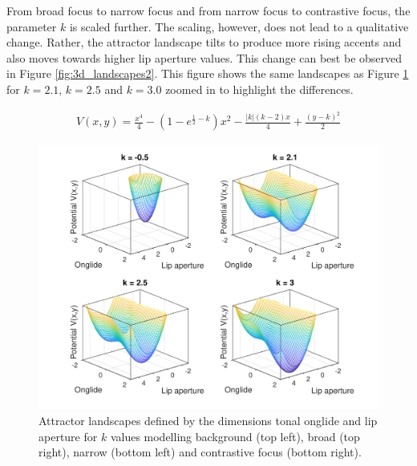From broad focus to narrow focus and from narrow focus to contrastive focus, the parameter $k$ is scaled further. The scaling, however, does not lead to a qualitative change. Rather, the attractor landscape tilts to produce more rising accents and also moves towards higher lip aperture values. This change can best be observed in Figure \ref{fig:3d_landscapes2}. This figure shows the same landscapes as Figure \ref{fig:3d_landscapes1} for $k = 2.1$, $k = 2.5$ and $k = 3.0$ zoomed in to highlight the differences.

\begin{equation}
\begin{split}
V(x,y) = \frac{x^4}{4} - (1-e^{\frac{1}{2}-k})x^2 - \frac{|k|(k-2)x}{4} + \frac{(y-k)^2}{2}
\label{eq:onglide_lips_model}
\end{split}
\end{equation}

\begin{figure}
\includegraphics[width=\textwidth]{figures/ch7/3d_landscapes1.pdf}
\caption[Attractor landscapes defined by the dimensions tonal onglide and lip aperture for background, broad, narrow and contrastive focus.]{Attractor landscapes defined by the dimensions tonal onglide and lip aperture for $k$ values modelling background (top left), broad (top right), narrow (bottom left) and contrastive focus (bottom right).}
\label{fig:3d_landscapes1}
\end{figure}

